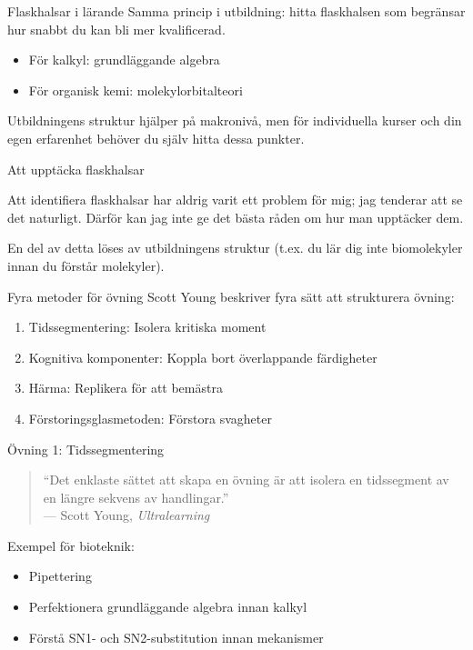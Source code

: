 \documentclass[presentation]{beamer}
\begin{document}
\begin{frame}{Flaskhalsar i lärande}
Samma princip i utbildning: hitta flaskhalsen som begränsar hur snabbt du kan bli mer kvalificerad.

\begin{itemize}
    \item För kalkyl: grundläggande algebra
    \item För organisk kemi: molekylorbitalteori
\end{itemize}

Utbildningens struktur hjälper på makronivå, men för individuella kurser och din egen erfarenhet behöver du själv hitta dessa punkter.

\end{frame}

\begin{frame}{Att upptäcka flaskhalsar}

Att identifiera flaskhalsar har aldrig varit ett problem för mig; jag tenderar att se det naturligt.
Därför kan jag inte ge det bästa råden om hur man upptäcker dem.

En del av detta löses av utbildningens struktur (t.ex. du lär dig inte biomolekyler innan du förstår molekyler).
\end{frame}

\begin{frame}{Fyra metoder för övning}
Scott Young beskriver fyra sätt att strukturera övning:
\begin{enumerate}
    \item Tidssegmentering: Isolera kritiska moment
    \item Kognitiva komponenter: Koppla bort överlappande färdigheter
    \item Härma: Replikera för att bemästra
    \item Förstoringsglasmetoden: Förstora svagheter
\end{enumerate}
\end{frame}

\begin{frame}{Övning 1: Tidssegmentering}
\begin{quote}
“Det enklaste sättet att skapa en övning är att isolera en tidssegment av en längre sekvens av handlingar.”\\
— Scott Young, \textit{Ultralearning}
\end{quote}

Exempel för bioteknik:
\begin{itemize}
    \item Pipettering
    \item Perfektionera grundläggande algebra innan kalkyl
    \item Förstå SN1- och SN2-substitution innan mekanismer
\end{itemize}
\end{frame}
\end{document}

